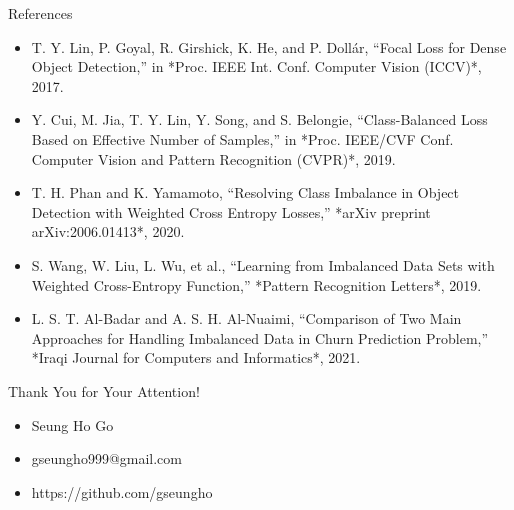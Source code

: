 \documentclass[aspectratio=169]{beamer}
\begin{document}
\begin{frame}{References}
    
    \vspace{0.05\textwidth}
    \footnotesize %
    \begin{itemize}
        \item[1] T. Y. Lin, P. Goyal, R. Girshick, K. He, and P. Dollár, “Focal Loss for Dense Object Detection,” in *Proc. IEEE Int. Conf. Computer Vision (ICCV)*, 2017.
        
        \vspace{0.3cm} %
        
        \item[2] Y. Cui, M. Jia, T. Y. Lin, Y. Song, and S. Belongie, “Class-Balanced Loss Based on Effective Number of Samples,” in *Proc. IEEE/CVF Conf. Computer Vision and Pattern Recognition (CVPR)*, 2019.
        
        \vspace{0.3cm}
        
        \item[3] T. H. Phan and K. Yamamoto, “Resolving Class Imbalance in Object Detection with Weighted Cross Entropy Losses,” *arXiv preprint arXiv:2006.01413*, 2020.
        
        \vspace{0.3cm}
        
        \item[4] S. Wang, W. Liu, L. Wu, et al., “Learning from Imbalanced Data Sets with Weighted Cross-Entropy Function,” *Pattern Recognition Letters*, 2019.
        
        \vspace{0.3cm}
        
        \item[5] L. S. T. Al-Badar and A. S. H. Al-Nuaimi, “Comparison of Two Main Approaches for Handling Imbalanced Data in Churn Prediction Problem,” *Iraqi Journal for Computers and Informatics*, 2021.
        
    \end{itemize}
\end{frame}

\begin{frame} %

\vfill
{\Huge Thank You for Your Attention!}

\vspace{0.5cm}

\begin{itemize}
    \item{\LARGE Seung Ho Go}
    \vspace{0.1cm}
    \item{\large gseungho999@gmail.com}
    \vspace{0.1cm}
    \item{\large https://github.com/gseungho}
\end{itemize}

\vfill %

\end{frame}
\end{document}
